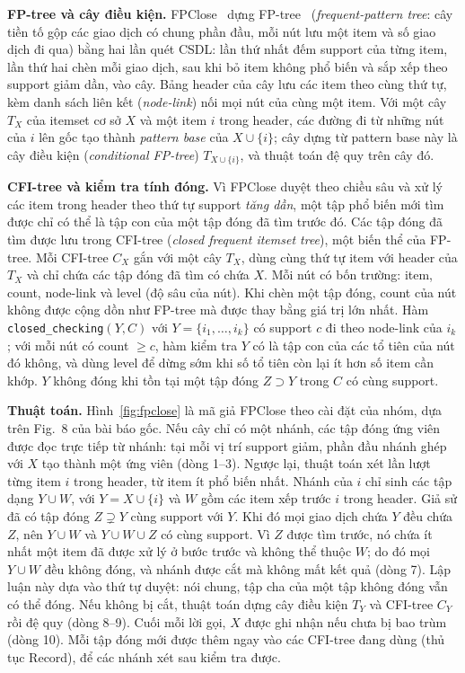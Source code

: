 \textbf{FP-tree và cây điều kiện.} FPClose~\cite{grahne2005} dựng FP-tree~\cite{han2000} (\textit{frequent-pattern
tree}: cây tiền tố gộp các giao dịch có chung phần đầu, mỗi nút lưu một item và số giao dịch đi qua) bằng hai lần quét
CSDL: lần thứ nhất đếm support của từng item, lần thứ hai chèn mỗi giao dịch, sau khi bỏ item không phổ biến và sắp xếp
theo support giảm dần, vào cây. Bảng header của cây lưu các item theo cùng thứ tự, kèm danh sách liên kết
(\textit{node-link}) nối mọi nút của cùng một item. Với một cây $T_X$ của itemset cơ sở $X$ và một item $i$ trong
header, các đường đi từ những nút của $i$ lên gốc tạo thành \textit{pattern base} của $X \cup \{i\}$; cây dựng từ
pattern base này là cây điều kiện (\textit{conditional FP-tree}) $T_{X \cup \{i\}}$, và thuật toán đệ quy trên cây đó.

\textbf{CFI-tree và kiểm tra tính đóng.} Vì FPClose duyệt theo chiều sâu và xử lý các item trong header theo thứ tự
support \emph{tăng dần}, một tập phổ biến mới tìm được chỉ có thể là tập con của một tập đóng đã tìm trước đó. Các tập
đóng đã tìm được lưu trong CFI-tree (\textit{closed frequent itemset tree}), một biến thể của FP-tree. Mỗi CFI-tree
$C_X$ gắn với một cây $T_X$, dùng cùng thứ tự item với header của $T_X$ và chỉ chứa các tập đóng đã tìm có chứa $X$.
Mỗi nút có bốn trường: item, count, node-link và level (độ sâu của nút). Khi chèn một tập đóng, count của nút không được
cộng dồn như FP-tree mà được thay bằng giá trị lớn nhất. Hàm \texttt{closed\_checking}$(Y, C)$ với
$Y = \{i_1, \ldots, i_k\}$ có support $c$ đi theo node-link của $i_k$; với mỗi nút có count $\geq c$, hàm kiểm tra $Y$
có là tập con của các tổ tiên của nút đó không, và dùng level để dừng sớm khi số tổ tiên còn lại ít hơn số item cần
khớp. $Y$ không đóng khi tồn tại một tập đóng $Z \supset Y$ trong $C$ có cùng support.

\textbf{Thuật toán.} Hình~\ref{fig:fpclose} là mã giả FPClose theo cài đặt
của nhóm, dựa trên Fig.~8 của bài báo gốc. Nếu cây chỉ có một nhánh, các
tập đóng ứng viên được đọc trực tiếp từ nhánh: tại mỗi vị trí support giảm,
phần đầu nhánh ghép với $X$ tạo thành một ứng viên (dòng 1--3). Ngược lại,
thuật toán xét lần lượt từng item $i$ trong header, từ item ít phổ biến nhất.
Nhánh của $i$ chỉ sinh các tập dạng $Y \cup W$, với $Y = X \cup \{i\}$ và $W$ gồm các item xếp trước $i$ trong header.
Giả sử đã có tập đóng $Z \supsetneq Y$ cùng support với $Y$. Khi đó mọi giao dịch chứa $Y$ đều chứa $Z$, nên
$Y \cup W$ và $Y \cup W \cup Z$ có cùng support. Vì $Z$ được tìm trước, nó chứa ít nhất một item đã được xử lý ở bước
trước và không thể thuộc $W$; do đó mọi $Y \cup W$ đều không đóng, và nhánh được cắt mà không mất kết quả (dòng 7).
Lập luận này dựa vào thứ tự duyệt: nói chung, tập cha của một tập không đóng vẫn có thể đóng. Nếu không bị cắt, thuật
toán dựng cây điều kiện $T_Y$ và CFI-tree $C_Y$ rồi đệ quy (dòng 8--9). Cuối
mỗi lời gọi, $X$ được ghi nhận nếu chưa bị bao trùm (dòng 10). Mỗi tập đóng
mới được thêm ngay vào các CFI-tree đang dùng (thủ tục Record), để các nhánh
xét sau kiểm tra được.

